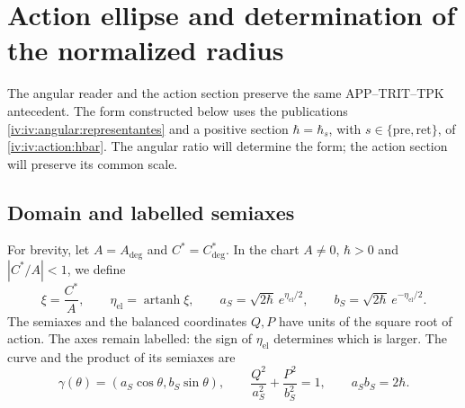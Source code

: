 \section{Action ellipse and determination of the normalized radius}
\label{iv:iv:ellipse:section}

The angular reader and the action section preserve the same
APP--TRIT--TPK antecedent. The form constructed
below uses the publications
\eqref{iv:iv:angular:representantes} and a positive section
\(\hbar=\hbar_s\), with
\(s\in\{\mathrm{pre},\mathrm{ret}\}\), of
\eqref{iv:iv:action:hbar}. The angular ratio will determine the form;
the action section will preserve its common scale.

\subsection{Domain and labelled semiaxes}
\label{iv:iv:ellipse:dominio}

For brevity, let \(A=A_{\deg}\) and \(C^*=C^*_{\deg}\).
In the chart \(A\ne0\), \(\hbar>0\) and \(|C^*/A|<1\),
we define
\begin{equation}
 \xi=\frac{C^*}{A},\qquad
 \eta_{\mathrm{el}}=\operatorname{artanh}\xi,\qquad
 a_S=\sqrt{2\hbar}\,e^{\eta_{\mathrm{el}}/2},\qquad
 b_S=\sqrt{2\hbar}\,e^{-\eta_{\mathrm{el}}/2}.
 \label{iv:iv:ellipse:semiejes}
\end{equation}
The semiaxes and the balanced coordinates \(Q,P\) have
units of the square root of action. The axes remain labelled:
the sign of \(\eta_{\mathrm{el}}\) determines which is
larger. The curve and the product of its semiaxes are
\begin{equation}
 \gamma(\theta)=(a_S\cos\theta,b_S\sin\theta),\qquad
 \frac{Q^2}{a_S^2}+\frac{P^2}{b_S^2}=1,\qquad
 a_Sb_S=2\hbar.
 \label{iv:iv:ellipse:curva}
\end{equation}

